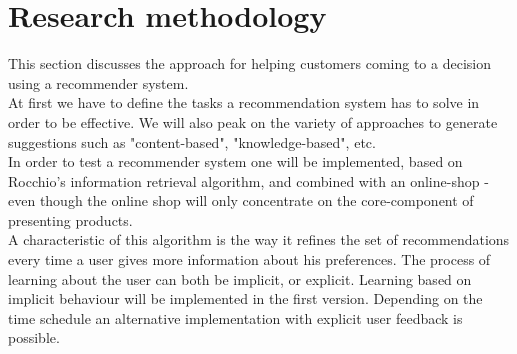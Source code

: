 


\section{Research methodology}

This section discusses the approach for helping customers coming to a decision using a recommender system.\\
At first we have to define the tasks a recommendation system has to solve in order to be effective.
We will also peak on the variety of approaches to generate suggestions such as "content-based", "knowledge-based", etc.\\
In order to test a recommender system one will be implemented, based on Rocchio's information retrieval algorithm, and combined with an online-shop - even though the online shop will only concentrate on the core-component of presenting products.\\
A characteristic of this algorithm is the way it refines the set of recommendations every time a user gives more information about his preferences.\citep[p. 92]{lops:11}
The process of learning about the user can both be implicit, or explicit.
Learning based on implicit behaviour will be implemented in the first version.
Depending on the time schedule an alternative implementation with explicit user feedback is possible.



